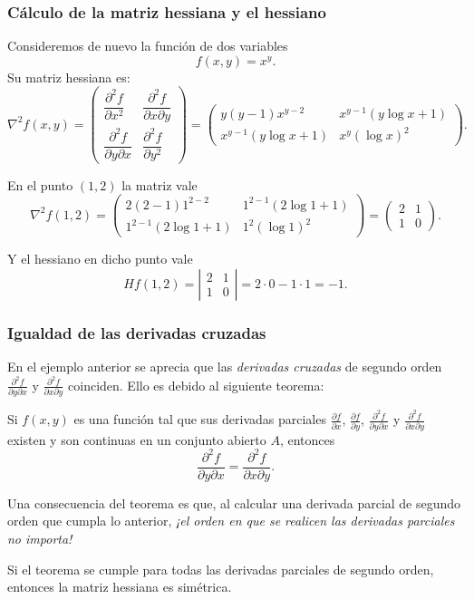 \begin{frame}
\frametitle{Cálculo de la matriz hessiana y el hessiano}
Consideremos de nuevo la función de dos variables
\[f(x,y)=x^y.\]
Su matriz hessiana es:
\[
\nabla^2f(x,y)=\left(
\begin{array}{cc}
\dfrac{\partial^2 f}{\partial x^2} & \dfrac{\partial^2 f}{\partial x \partial y}\\
\dfrac{\partial^2 f}{\partial y \partial x} & \dfrac{\partial^2 f}{\partial y^2} 
\end{array}
\right)
=
\left(
\begin{array}{cc}
y(y-1)x^{y-2} & x^{y-1}(y\log x+1) \\
x^{y-1}(y\log x+1) & x^y(\log x)^2
\end{array}
\right).
\]

En el punto $(1,2)$ la matriz vale
\[
\nabla^2f(1,2)=\left(
\begin{array}{cc}
2(2-1)1^{2-2} & 1^{2-1}(2\log 1+1) \\
1^{2-1}(2\log 1+1) & 1^2(\log 1)^2
\end{array}
\right)
=
\left(
\begin{array}{cc}
2 & 1 \\
1 & 0 
\end{array}
\right).
\]

Y el hessiano en dicho punto vale
\[ 
Hf(1,2)=\left|
\begin{array}{cc}
2 & 1 \\
1 & 0
\end{array}
\right|=
2\cdot 0-1\cdot1= -1.
\]
\end{frame}


\begin{frame}
\frametitle{Igualdad de las derivadas cruzadas}
En el ejemplo anterior se aprecia que las \emph{derivadas cruzadas} de segundo orden $\frac{\partial^2 f}{\partial y\partial x}$ y $\frac{\partial^2 f}{\partial x\partial y}$ coinciden. Ello es debido al siguiente teorema: 

\begin{teorema}
Si $f(x,y)$ es una función tal que sus derivadas parciales $\frac{\partial f}{\partial x}$, $\frac{\partial f}{\partial y}$, $\frac{\partial^2 f}{\partial y\partial x}$ y $\frac{\partial^2 f}{\partial x\partial y}$ existen y son continuas en un conjunto abierto $A$, entonces
\[
\frac{\partial^2 f}{\partial y\partial x}=\frac{\partial^2 f}{\partial x\partial y}.
\]
\end{teorema}

Una consecuencia del teorema es que, al calcular una derivada parcial de segundo orden que cumpla lo anterior, \alert{\emph{¡el orden en que se realicen las derivadas parciales no importa!}}

Si el teorema se cumple para todas las derivadas parciales de segundo orden, entonces la matriz hessiana es simétrica. 
\end{frame}



